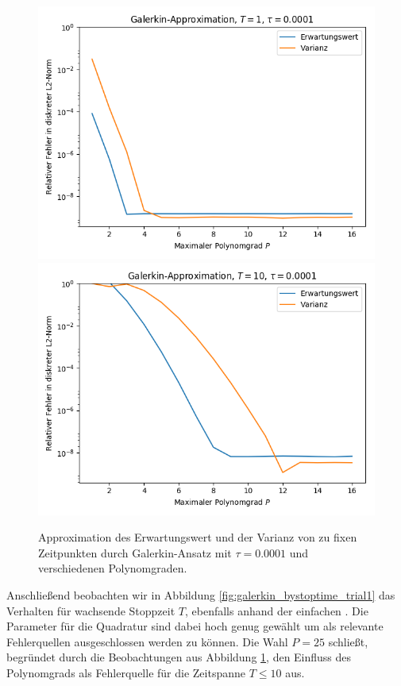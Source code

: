 \begin{figure}[!htb]
  \includegraphics[width=\linewidth]{Figures/galerkin_bydegree_trial1_t1.png}
\endminipage
{}
  \includegraphics[width=\linewidth]{Figures/galerkin_bydegree_trial1_t10.png}
\endminipage
  \caption{Approximation des Erwartungswert und der Varianz von  zu fixen Zeitpunkten durch Galerkin-Ansatz mit $\tau=0.0001$ und verschiedenen Polynomgraden.}
  \label{fig:galerkin_bydegree_trial1}
\end{figure}
\newline
Anschließend beobachten wir in Abbildung \ref{fig:galerkin_bystoptime_trial1} das Verhalten für wachsende Stoppzeit $T$, ebenfalls anhand der einfachen . Die Parameter für die Quadratur sind dabei hoch genug gewählt um als relevante Fehlerquellen ausgeschlossen werden zu können. Die Wahl $P=25$ schließt, begründet durch die Beobachtungen aus Abbildung \ref{fig:galerkin_bydegree_trial1}, den Einfluss des Polynomgrads als Fehlerquelle für die Zeitspanne $T\le 10$ aus.\\
